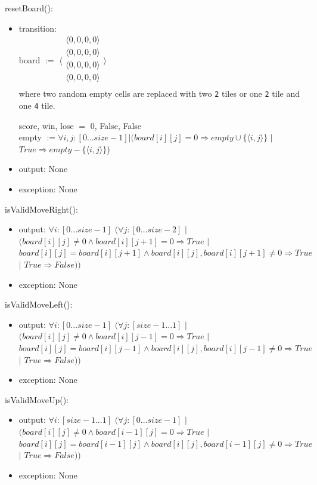 \documentclass[12pt]{article}
\begin{document}
\noindent resetBoard():
\begin{itemize}
\item transition:\\
      board $:=$ 
      $\langle \begin{array}{c}
      \langle 0, 0, 0, 0 \rangle\\
      \langle 0, 0, 0, 0 \rangle\\
      \langle 0, 0, 0, 0 \rangle\\
      \langle 0, 0, 0, 0 \rangle\\
      \end{array} \rangle$ \\ 
      where two random empty cells are replaced with two \texttt{2} tiles or one \texttt{2} tile and one \texttt{4} tile.

      score, win, lose $=$ 0, False, False\\
      empty $:= \forall i, j : [0...size-1] | (board[i][j] = 0 \Rightarrow empty \cup \{\langle i, j \rangle\}$ $|$ $True \Rightarrow empty - \{\langle i, j \rangle\}$)
\item output: None
\item exception: None
\end{itemize}

\noindent isValidMoveRight():
\begin{itemize}
\item output: $\forall i : [0...size-1]$ $(\forall j : [0...size-2]$ $|$ $(board[i][j] \ne 0 \land board[i][j+1]=0 \Rightarrow True$ $|$ $board[i][j] = board[i][j+1] \land board[i][j], board[i][j+1] \ne 0 \Rightarrow True$ $|$ $True \Rightarrow False))$
\item exception: None
\end{itemize}

\noindent isValidMoveLeft():
\begin{itemize}
\item output: $\forall i : [0...size-1]$ $(\forall j : [size-1...1]$ $|$ $(board[i][j] \ne 0 \land board[i][j-1]=0 \Rightarrow True$ $|$ $board[i][j] = board[i][j-1] \land board[i][j], board[i][j-1] \ne 0 \Rightarrow True$ $|$ $True \Rightarrow False))$
\item exception: None
\end{itemize}

\noindent isValidMoveUp():
\begin{itemize}
\item output: $\forall i : [size-1...1]$ $(\forall j : [0...size-1]$ $|$ $(board[i][j] \ne 0 \land board[i-1][j]=0 \Rightarrow True$ $|$ $board[i][j] = board[i-1][j] \land board[i][j], board[i-1][j] \ne 0 \Rightarrow True$ $|$ $True \Rightarrow False))$
\item exception: None
\end{itemize}
\end{document}
